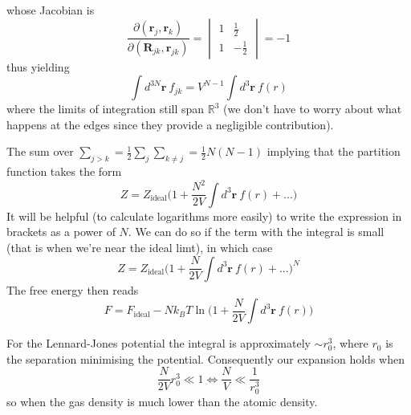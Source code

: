 \documentclass[a4paper,11pt,oneside]{book}
\begin{document}
whose Jacobian is 
\begin{equation}
    \frac{\partial(\textbf{r}_j,\textbf{r}_k)}{\partial(\textbf{R}_{jk},\textbf{r}_{jk})} = \begin{vmatrix}1 & \frac{1}{2}\\
    1 & -\frac{1}{2}
    \end{vmatrix}=-1
\end{equation}
thus yielding
\begin{equation}
     \int d^{3N}\textbf{r} \ f_{jk} = V^{N-1} \int d^3\textbf{r} \  f(r)
\end{equation}
where the limits of integration still span $\mathbb{R}^3$ (we don't have to worry about what happens at the edges since they provide a negligible contribution).

The sum over $\sum_{j>k} =\frac{1}{2}\sum_j \sum_{k\neq j}= \frac{1}{2}N(N-1)$ implying that the partition function takes the form
\begin{equation}
    Z = Z_{\text{ideal}} \bigg(1+\frac{N^2}{2V} \int d^3\textbf{r} \  f(r)+...\bigg)
\end{equation}
It will be helpful (to calculate logarithms more easily) to write the expression in brackets as a power of $N$. We can do so if the term with the integral is small (that is when we're near the ideal limt), in which case
\begin{equation}
     Z = Z_{\text{ideal}} \bigg(1+\frac{N}{2V} \int d^3\textbf{r}\  f(r)+...\bigg)^N
\end{equation}
The free energy then reads
\begin{equation}
    F=F_{\text{ideal}} - Nk_BT \ln\bigg(1+\frac{N}{2V}\int d^3\textbf{r} \ f(r)\bigg)
\end{equation}

For the Lennard-Jones potential the integral is approximately $\sim r_0^3$, where $r_0$ is the separation minimising the potential. Consequently our expansion holds when
\begin{equation}
    \frac{N}{2V}r_0^3 \ll 1 \iff \frac{N}{V} \ll \frac{1}{r_0^3}
\end{equation}
so when the gas density is much lower than the atomic density.
\end{document}
